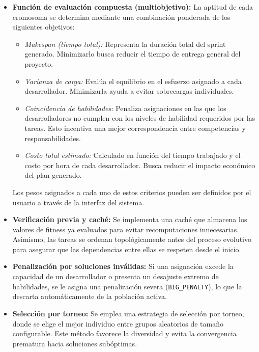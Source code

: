 \begin{itemize}
    \item \textbf{Función de evaluación compuesta (multiobjetivo):} La aptitud de cada cromosoma se determina mediante una combinación ponderada de los siguientes objetivos:
          \begin{itemize}
              \item \textit{Makespan (tiempo total):} Representa la duración total del sprint generado. Minimizarlo busca reducir el tiempo de entrega general del proyecto.
              \item \textit{Varianza de carga:} Evalúa el equilibrio en el esfuerzo asignado a cada desarrollador. Minimizarla ayuda a evitar sobrecargas individuales.
              \item \textit{Coincidencia de habilidades:} Penaliza asignaciones en las que los desarrolladores no cumplen con los niveles de habilidad requeridos por las tareas. Esto incentiva una mejor correspondencia entre competencias y responsabilidades.
              \item \textit{Costo total estimado:} Calculado en función del tiempo trabajado y el costo por hora de cada desarrollador. Busca reducir el impacto económico del plan generado.
          \end{itemize}
          Los pesos asignados a cada uno de estos criterios pueden ser definidos por el usuario a través de la interfaz del sistema.

    \item \textbf{Verificación previa y caché:} Se implementa una caché que almacena los valores de fitness ya evaluados para evitar recomputaciones innecesarias. Asimismo, las tareas se ordenan topológicamente antes del proceso evolutivo para asegurar que las dependencias entre ellas se respeten desde el inicio.

    \item \textbf{Penalización por soluciones inválidas:} Si una asignación excede la capacidad de un desarrollador o presenta un desajuste extremo de habilidades, se le asigna una penalización severa (\texttt{BIG\_PENALTY}), lo que la descarta automáticamente de la población activa.

    \item \textbf{Selección por torneo:} Se emplea una estrategia de selección por torneo, donde se elige el mejor individuo entre grupos aleatorios de tamaño configurable. Este método favorece la diversidad y evita la convergencia prematura hacia soluciones subóptimas.


\end{itemize}
